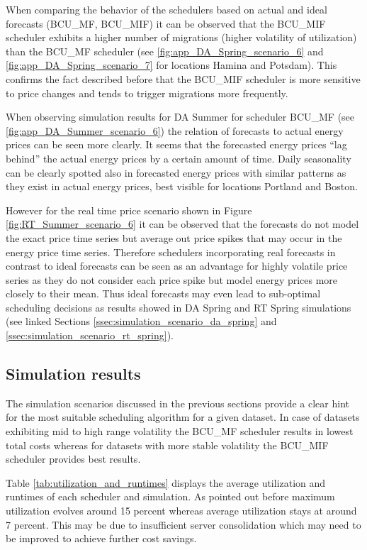 When comparing the behavior of the schedulers based on actual and ideal forecasts (BCU\_MF, BCU\_MIF) it can be observed that the BCU\_MIF scheduler exhibits a higher number of migrations (higher volatility of utilization) than the BCU\_MF scheduler (see \ref{fig:app_DA_Spring_scenario_6} and \ref{fig:app_DA_Spring_scenario_7} for locations Hamina and Potsdam). This confirms the fact described before that the BCU\_MIF scheduler is more sensitive to price changes and tends to trigger migrations more frequently. 

When observing simulation results for DA Summer for scheduler BCU\_MF (see \ref{fig:app_DA_Summer_scenario_6}) the relation of forecasts to actual energy prices can be seen more clearly. It seems that the forecasted energy prices ``lag behind'' the actual energy prices by a certain amount of time. Daily seasonality can be clearly spotted also in forecasted energy prices with similar patterns as they exist in actual energy prices, best visible for locations Portland and Boston. 

However for the real time price scenario shown in Figure \ref{fig:RT_Summer_scenario_6} it can be observed that the forecasts do not model the exact price time series but average out price spikes that may occur in the energy price time series. Therefore schedulers incorporating real forecasts in contrast to ideal forecasts can be seen as an advantage for highly volatile price series as they do not consider each price spike but model energy prices more closely to their mean. 
Thus ideal forecasts may even lead to sub-optimal scheduling decisions as results showed in DA Spring and RT Spring simulations (see linked Sections \ref{ssec:simulation_scenario_da_spring} and \ref{ssec:simulation_scenario_rt_spring}). 


\subsection{Simulation results}

The simulation scenarios discussed in the previous sections provide a clear hint for the most suitable scheduling algorithm for a given dataset. 
In case of datasets exhibiting mid to high range volatility the BCU\_MF scheduler results in lowest total costs whereas for datasets with more stable volatility the BCU\_MIF scheduler provides best results. 

Table \ref{tab:utilization_and_runtimes} displays the average utilization and runtimes of each scheduler and simulation. As pointed out before maximum utilization evolves around 15 percent whereas average utilization stays at around 7 percent. This may be due to insufficient server consolidation which may need to be improved to achieve further cost savings. 


